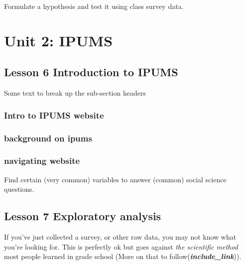 \documentclass[
]{book}
\begin{document}
Formulate a hypothesis and test it using class survey data.

\hypertarget{unit-2-ipums}{%
\chapter*{Unit 2: IPUMS}\label{unit-2-ipums}}

\hypertarget{lesson-6-introduction-to-ipums}{%
\section*{Lesson 6 Introduction to IPUMS}\label{lesson-6-introduction-to-ipums}}

Some text to break up the sub-section headers

\hypertarget{intro-to-ipums-website}{%
\subsection*{Intro to IPUMS website}\label{intro-to-ipums-website}}

\hypertarget{background-on-ipums}{%
\subsection*{background on ipums}\label{background-on-ipums}}

\hypertarget{navigating-website}{%
\subsection*{navigating website}\label{navigating-website}}

Find certain (very common) variables to answer (common) social science questions.

\hypertarget{lesson-7-exploratory-analysis}{%
\section*{Lesson 7 Exploratory analysis}\label{lesson-7-exploratory-analysis}}

If you've just collected a survey, or other raw data, you may not know what you're looking for. This is perfectly ok but goes against \emph{the scientific method} most people learned in grade school (More on that to follow(\textbf{\emph{include\_link}})).
\end{document}
